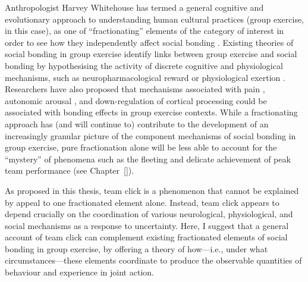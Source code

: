 Anthropologist Harvey Whitehouse has termed a general cognitive and evolutionary approach to understanding human cultural practices (group exercise, in this case), as one of ``fractionating'' elements of the category of interest in order to see how they independently affect social bonding \citep[][2]{Whitehouse2014}.  Existing theories of social bonding in group exercise identify links between group exercise and social bonding by hypothesising the activity of discrete cognitive and physiological mechanisms, such as neuropharmacological reward \citep[as a result of either behavioural synchrony; see][]{Dunbar2010,Tarr2014} or physiological exertion \citep{Cohen2009,Davis2015}.  Researchers have also proposed that mechanisms associated with pain \citep{Bastian2012,Xygalatas2013}, autonomic arousal \citep{Swann2010a}, and down-regulation of cortical processing \citep{Dietrich2004,Slingerland2014} could be associated with bonding effects in group exercise contexts.  While a fractionating approach has (and will continue to) contribute to the development of an increasingly granular picture of the component mechanisms of social bonding in group exercise, pure fractionation alone will be less able to account for the ``mystery'' of phenomena such as the fleeting and delicate achievement of peak team performance (see Chapter~\ref{}).

As proposed in this thesis, team click is a phenomenon that cannot be explained by appeal to one fractionated element alone.  Instead, team click appears to depend crucially on the coordination of various neurological, physiological, and social mechanisms as a response to uncertainty.  Here, I suggest that a general account of team click can complement existing fractionated elements of social bonding in group exercise, by offering a theory of how—i.e., under what circumstances---these elements coordinate to produce the observable quantities of behaviour and experience in joint action.

